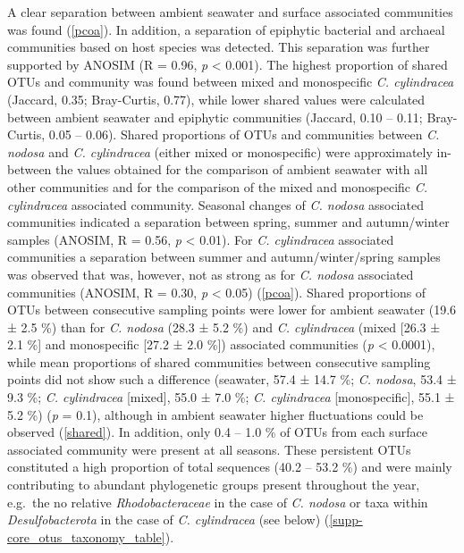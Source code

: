 \documentclass[
  12pt,
]{article}
\begin{document}
A clear separation between ambient seawater and surface associated
communities was found (\autoref{pcoa}). In addition, a separation of
epiphytic bacterial and archaeal communities based on host species was
detected. This separation was further supported by ANOSIM (R = 0.96,
\emph{p} \textless{} 0.001). The highest proportion of shared OTUs and
community was found between mixed and monospecific \emph{C. cylindracea}
(Jaccard, 0.35; Bray-Curtis, 0.77), while lower shared values were
calculated between ambient seawater and epiphytic communities (Jaccard,
0.10 -- 0.11; Bray-Curtis, 0.05 -- 0.06). Shared proportions of OTUs and
communities between \emph{C. nodosa} and \emph{C. cylindracea} (either
mixed or monospecific) were approximately in-between the values obtained
for the comparison of ambient seawater with all other communities and
for the comparison of the mixed and monospecific \emph{C. cylindracea}
associated community. Seasonal changes of \emph{C. nodosa} associated
communities indicated a separation between spring, summer and
autumn/winter samples (ANOSIM, R = 0.56, \emph{p} \textless{} 0.01). For
\emph{C. cylindracea} associated communities a separation between summer
and autumn/winter/spring samples was observed that was, however, not as
strong as for \emph{C. nodosa} associated communities (ANOSIM, R = 0.30,
\emph{p} \textless{} 0.05) (\autoref{pcoa}). Shared proportions of OTUs
between consecutive sampling points were lower for ambient seawater
(19.6 ± 2.5 \si{\percent}) than for \emph{C. nodosa} (28.3 ± 5.2
\si{\percent}) and \emph{C. cylindracea} (mixed {[}26.3 ± 2.1
\si{\percent}{]} and monospecific {[}27.2 ± 2.0 \si{\percent}{]})
associated communities (\emph{p} \textless{} 0.0001), while mean
proportions of shared communities between consecutive sampling points
did not show such a difference (seawater, 57.4 ± 14.7 \si{\percent};
\emph{C. nodosa}, 53.4 ± 9.3 \si{\percent}; \emph{C. cylindracea}
{[}mixed{]}, 55.0 ± 7.0 \si{\percent}; \emph{C. cylindracea}
{[}monospecific{]}, 55.1 ± 5.2 \si{\percent}) (\emph{p} = 0.1), although
in ambient seawater higher fluctuations could be observed
(\autoref{shared}). In addition, only 0.4 -- 1.0 \si{\percent} of OTUs
from each surface associated community were present at all seasons.
These persistent OTUs constituted a high proportion of total sequences
(40.2 -- 53.2 \si{\percent}) and were mainly contributing to abundant
phylogenetic groups present throughout the year, e.g.~the no relative
\emph{Rhodobacteraceae} in the case of \emph{C. nodosa} or taxa within
\emph{Desulfobacterota} in the case of \emph{C. cylindracea} (see below)
(\autoref{supp-core_otus_taxonomy_table}).
\end{document}
